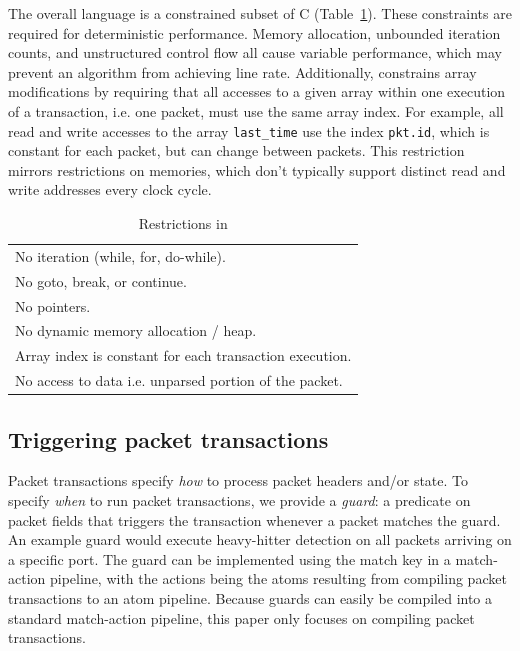 The overall language is a constrained subset of C (Table~\ref{tab:restrict}).
These constraints are required for deterministic performance.  Memory
allocation, unbounded iteration counts, and unstructured control flow all cause
variable performance, which may prevent an algorithm from achieving line rate.
Additionally, \pktlanguage constrains array modifications by requiring that all
accesses to a given array within one execution of a transaction, i.e. one
packet, must use the same array index. For example, all read and write accesses
to the array \texttt{last\_time} use the index \texttt{pkt.id}, which is
constant for each packet, but can change between packets. This restriction
mirrors restrictions on memories, which don't typically support distinct read
and write addresses every clock cycle.

\begin{table}
  \begin{tabular}{p{}}
    No iteration (while, for, do-while).\\
    No goto, break, or continue.\\
    No pointers.\\
    No dynamic memory allocation / heap.\\
    Array index is constant for each transaction execution.\\
    No access to data i.e. unparsed portion of the packet.\\
  \end{tabular}
  \caption{Restrictions in \pktlanguage}
  \label{tab:restrict}
\end{table}

\subsection{Triggering packet transactions}
\label{ss:guards}
Packet transactions specify \textit{how} to process packet headers and/or
state.  To specify {\em when} to run packet transactions, we provide a {\em
guard}: a predicate on packet fields that triggers the transaction whenever a
packet matches the guard. An example guard would execute heavy-hitter detection
on all packets arriving on a specific port. The guard can be implemented using
the match key in a match-action pipeline, with the actions being the atoms
resulting from compiling packet transactions to an atom pipeline. Because
guards can easily be compiled into a standard match-action pipeline, this paper
only focuses on compiling packet transactions.


